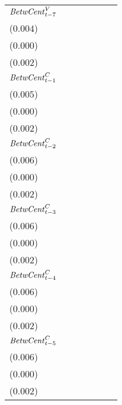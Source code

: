 \begin{tabular}{lllllll}
${\it BetwCent}^V_{t-7}$   &     \makecell{$-0.000^{}$ \\ ($0.004$)} &      \makecell{$0.000^{}$ \\ ($0.000$)} &   \makecell{$0.074^{***}$ \\ ($0.002$)} &                             \makecell{} &                             \makecell{} &                             \makecell{} \\
${\it BetwCent}^C_{t-1}$   &                             \makecell{} &                             \makecell{} &                             \makecell{} &   \makecell{$0.026^{***}$ \\ ($0.005$)} &      \makecell{$0.000^{}$ \\ ($0.000$)} &   \makecell{$0.686^{***}$ \\ ($0.002$)} \\
${\it BetwCent}^C_{t-2}$   &                             \makecell{} &                             \makecell{} &                             \makecell{} &  \makecell{$-0.041^{***}$ \\ ($0.006$)} &     \makecell{$-0.000^{}$ \\ ($0.000$)} &   \makecell{$0.073^{***}$ \\ ($0.002$)} \\
${\it BetwCent}^C_{t-3}$   &                             \makecell{} &                             \makecell{} &                             \makecell{} &   \makecell{$0.025^{***}$ \\ ($0.006$)} &   \makecell{$0.001^{***}$ \\ ($0.000$)} &   \makecell{$0.119^{***}$ \\ ($0.002$)} \\
${\it BetwCent}^C_{t-4}$   &                             \makecell{} &                             \makecell{} &                             \makecell{} &  \makecell{$-0.031^{***}$ \\ ($0.006$)} &     \makecell{$-0.000^{}$ \\ ($0.000$)} &   \makecell{$0.006^{***}$ \\ ($0.002$)} \\
${\it BetwCent}^C_{t-5}$   &                             \makecell{} &                             \makecell{} &                             \makecell{} &      \makecell{$0.003^{}$ \\ ($0.006$)} &  \makecell{$-0.000^{***}$ \\ ($0.000$)} &  \makecell{$-0.043^{***}$ \\ ($0.002$)} \\

\end{tabular}
